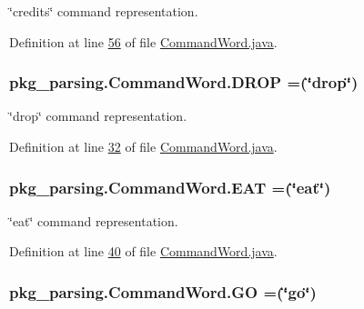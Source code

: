 \char`\"{}credits\char`\"{} command representation. 



Definition at line \hyperlink{CommandWord_8java_source_l00056}{56} of file \hyperlink{CommandWord_8java_source}{Command\-Word.\-java}.

\hypertarget{enumpkg__parsing_1_1CommandWord_abc97c312acca6eef77cc303d91d2d811}{
\subsubsection[{D\-R\-O\-P}]{\setlength{\rightskip}{0pt plus 5cm}pkg\-\_\-parsing.\-Command\-Word.\-D\-R\-O\-P =(\char`\"{}drop\char`\"{})}}\label{enumpkg__parsing_1_1CommandWord_abc97c312acca6eef77cc303d91d2d811}


\char`\"{}drop\char`\"{} command representation. 



Definition at line \hyperlink{CommandWord_8java_source_l00032}{32} of file \hyperlink{CommandWord_8java_source}{Command\-Word.\-java}.

\hypertarget{enumpkg__parsing_1_1CommandWord_a4fe488aea9cdd9ed9455682d42a300b3}{
\subsubsection[{E\-A\-T}]{\setlength{\rightskip}{0pt plus 5cm}pkg\-\_\-parsing.\-Command\-Word.\-E\-A\-T =(\char`\"{}eat\char`\"{})}}\label{enumpkg__parsing_1_1CommandWord_a4fe488aea9cdd9ed9455682d42a300b3}


\char`\"{}eat\char`\"{} command representation. 



Definition at line \hyperlink{CommandWord_8java_source_l00040}{40} of file \hyperlink{CommandWord_8java_source}{Command\-Word.\-java}.

\hypertarget{enumpkg__parsing_1_1CommandWord_a82b58f470d1dbcf2a9e5826632d66524}{
\subsubsection[{G\-O}]{\setlength{\rightskip}{0pt plus 5cm}pkg\-\_\-parsing.\-Command\-Word.\-G\-O =(\char`\"{}go\char`\"{})}}\label{enumpkg__parsing_1_1CommandWord_a82b58f470d1dbcf2a9e5826632d66524}


